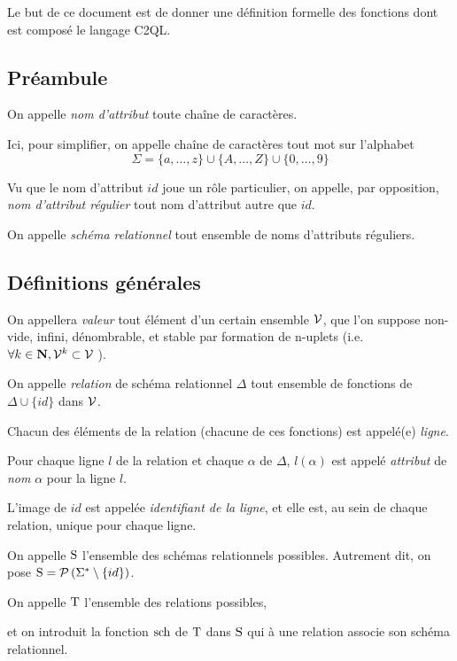 Le but de ce document est de donner une définition
formelle des fonctions dont est composé le langage C2QL.

\subsection*{Préambule}

\begin{defi}
	On appelle \emph{nom d'attribut} toute chaîne de caractères.
	
	Ici, pour simplifier, on appelle chaîne de caractères
	tout mot sur l'alphabet 
	$$
	\Sigma = \{a, \dots, z\} \cup \{A, \dots, Z \} \cup \{0, \dots,  9 \}
	$$
	
	Vu que le nom d'attribut \og $id$ \fg{} joue un rôle particulier,
	on appelle, par opposition, \emph{nom d'attribut régulier}
	tout nom d'attribut autre que \og $id$\fg{}. 
\end{defi}	

\begin{defi}
	On appelle \emph{schéma relationnel} tout ensemble
	de noms d'attributs réguliers.
\end{defi}

\subsection*{Définitions générales}

\begin{defi}
	On appellera \emph{valeur} tout élément d'un certain ensemble
	$\mathcal{V}$, que l'on suppose non-vide, infini, dénombrable, et stable
	par formation de n-uplets
	(i.e. $\forall k \in \mathbf{N}, \mathcal{V}^k \subset \mathcal{V}$ ). 
\end{defi}

\begin{defi}
	On appelle \emph{relation} de schéma relationnel $\Delta$
	tout ensemble de fonctions de $\Delta \cup \{ id \}$ dans $\mathcal{V}$.
	
	Chacun des éléments de la relation (chacune de ces fonctions)
	est appelé(e) \emph{ligne}.
	
	Pour chaque ligne $l$ de la relation et chaque $\alpha$ de $\Delta$,
	$l(\alpha)$ est appelé \emph{attribut} de \emph{nom} $\alpha$ pour la ligne $l$.
	
	L'image de $id$ est appelée \emph{identifiant de la ligne}, et elle est, au sein de chaque
	relation, unique pour chaque ligne.
\end{defi}

\begin{defi}
	On appelle $\operatorname{S}$ l'ensemble des schémas relationnels possibles.
	Autrement dit, on pose  $\operatorname{S} = \mathcal{P}\left( \Sigma^* \setminus \{id\} \right)$.
	
	On appelle $\operatorname{T}$ l'ensemble des relations possibles,
	
	et on introduit la fonction $\operatorname{sch}$ de $\operatorname{T}$ dans
	$\operatorname{S}$
	qui à une relation associe son schéma relationnel.
\end{defi}


